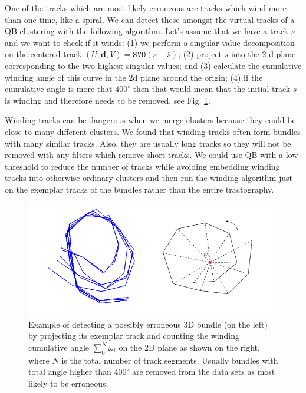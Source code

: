 \documentclass[preprint,authoryear,a4paper,10pt,onecolumn]{elsarticle}
\begin{document}
One of the tracks which are most likely erroneous are tracks which wind
more than one time, like a spiral. We can detect these amongst the
virtual tracks of a QB clustering with the following algorithm. Let's
assume that we have a track $s$ and we want to check if it winds: (1) we
perform a singular value decomposition on the centered track
$(U,\mathbf{d},V)=\mathtt{SVD}(s-\bar{s})$; (2) project $s$ into the 2-d
plane corresponding to the two highest singular values; and (3)
calculate the cumulative winding angle of this curve in the 2d plane
around the origin; (4) if the cumulative angle is more that
$400^{\circ}$ then that would mean that the initial track $s$ is winding
and therefore needs to be removed, see Fig. \ref{Flo:winding}.

Winding tracks can be dangerous when we merge clusters because they
could be close to many different clusters. We found that winding tracks
often form bundles with many similar tracks. Also, they are usually long
tracks so they will not be removed with any filters which remove short
tracks. We could use QB with a low threshold to reduce the number of
tracks while avoiding embedding winding tracks into otherwise ordinary
clusters and then run the winding algorithm just on the exemplar tracks
of the bundles rather than the entire tractography.

\begin{figure}
\begin{centering}
\includegraphics[scale=0.5]{last_figures/winding}
\par\end{centering}
\caption{Example of detecting a possibly erroneous 3D bundle (on the
  left) by projecting its exemplar track and counting the winding
  cumulative angle $\sum_{0}^{N}\omega_{i}$ on the 2D plane as shown on
  the right, where $N$ is the total number of track segments. Usually
  bundles with total angle higher than $400^{\circ}$ are removed from
  the data sets as most likely to be erroneous.\label{Flo:winding}}
\end{figure}
\end{document}
